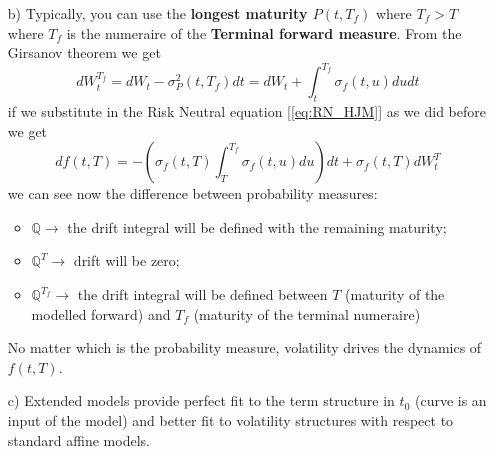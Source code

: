 \documentclass{article}
\begin{document}
\begin{itemize}
    \item[b)]  Typically, you can use the \textbf{longest maturity $P(t,T_f)$} where $T_f > T$ where $T_f$ is the numeraire of the \textbf{Terminal forward measure}. From the Girsanov theorem we get
\begin{equation*}
    dW_t^{T_f} = dW_t - \sigma_P^2(t,T_f)dt = dW_t + \int_t^{T_f} \sigma_f(t,u)du dt
\end{equation*}
if we substitute in the Risk Neutral equation [\ref{eq:RN_HJM}] as we did before we get
\begin{equation*}\label{eq:TERM_HJM}
    df(t,T) = - \left( \sigma_f(t,T) \int_T^{T_f}  \sigma_f(t,u) du \right) dt + \sigma_f(t,T)dW^T_t
\end{equation*}
we can see now the difference between probability measures:
\begin{itemize}
    \item $\mathbb{Q} \to $ the drift integral will be defined with the remaining maturity;
    \item $\mathbb{Q}^T \to $ drift will be zero;
    \item $\mathbb{Q}^{T_f} \to $ the drift integral will be defined between $T$ (maturity of the modelled forward) and $T_f$ (maturity of the terminal numeraire)
\end{itemize}
No matter which is the probability measure, volatility drives the dynamics of $f(t,T)$.
 \item[c)] Extended models provide perfect fit to the term structure in $t_0$ (curve is an input of the model) and better fit to volatility structures with respect to standard affine models.
\end{itemize}
\end{document}
